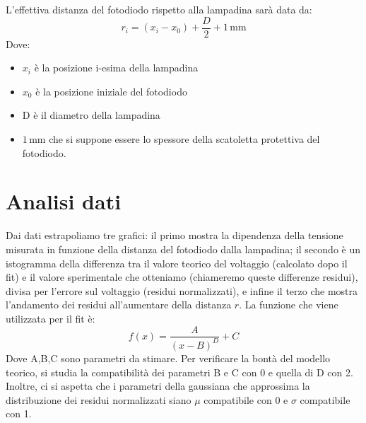 \documentclass[10pt,twocolumn]{article}
\begin{document}
\begin{figure}[htbp]
    \centering
\end{figure}
\noindent L'effettiva distanza del fotodiodo rispetto alla lampadina sarà data da:
\[
r_i=(x_i-x_0)+\frac{D}{2}+ 1 \, \mathrm{mm}
\]
Dove:
\begin{itemize}
	\item $x_i$ è la posizione  i-esima della lampadina
	\item $x_0$ è la posizione iniziale del fotodiodo 
	\item D è il diametro della lampadina
	\item $1 \, \mathrm{mm}$ che si suppone essere lo spessore della scatoletta protettiva del fotodiodo.
\end{itemize}
\section{Analisi dati}
Dai dati estrapoliamo tre grafici: il primo mostra la dipendenza della tensione misurata in funzione della distanza del fotodiodo dalla lampadina;
il secondo è un istogramma della differenza tra il valore teorico del voltaggio (calcolato dopo il fit) e il valore sperimentale che otteniamo (chiameremo queste differenze residui), divisa per 
l'errore sul voltaggio (residui normalizzati), e infine il terzo che mostra l'andamento dei residui 
all'aumentare della distanza $r$. La funzione che viene utilizzata per il fit è:
\begin{equation}
    f(x) = \frac{A}{(x-B)^D} + C
\end{equation}
Dove A,B,C sono parametri da stimare. 
Per verificare la bontà del modello teorico, si studia la compatibilità dei parametri B e C con 0 e quella di D con 2. 
\noindent Inoltre, ci si aspetta che i parametri della gaussiana che approssima la distribuzione dei residui normalizzati siano $\mu$ compatibile con 0 e $\sigma$ compatibile con 1.
\end{document}
